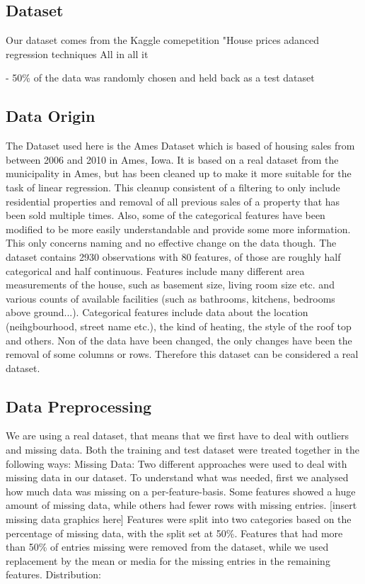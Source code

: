 \documentclass{article}
\begin{document}
\subsection{Dataset} 
Our dataset comes from the Kaggle comepetition "House prices adanced regression techniques \cite{kaggle}
All in all it 

- 50\% of the data was randomly chosen and held back as a test dataset
\subsection{Data Origin}
The Dataset used here is the Ames Dataset \cite{cock_2011} which is based of housing sales from between 2006 and 2010 in Ames, Iowa.
It is based on a real dataset from the municipality in Ames, but has been cleaned up to make it more suitable for the task of linear regression.
This cleanup consistent of a filtering to only include residential properties and removal of all previous sales of a property that has been sold multiple times.
Also, some of the categorical features have been modified to be more easily understandable and provide some more information. This only concerns naming and no effective change on the data though.
The dataset contains 2930 observations with 80 features, of those are roughly half categorical and half continuous. Features include many different area measurements of the house, such as basement size, living room size etc. and various counts of available facilities (such as bathrooms, kitchens, bedrooms above ground...). Categorical features include data about the location (neihgbourhood, street name etc.), the kind of heating, the style of the roof top and others.
Non of the data have been changed, the only changes have been the removal of some columns or rows. Therefore this dataset can be considered a real dataset.
\subsection{Data Preprocessing}
We are using a real dataset, that means that we first have to deal with outliers and missing data. Both the training and test dataset were treated together in the following ways:
Missing Data:\newline
Two different approaches were used to deal with missing data in our dataset. To understand what was needed, first we analysed how much data was missing on a per-feature-basis. Some features showed a huge amount of missing data, while others had fewer rows with missing entries.
[insert missing data graphics here]
Features were split into two categories based on the percentage of missing data, with the split set at 50\%. Features that had more than 50\% of entries missing were removed from the dataset, while we used replacement by the mean or media for the missing entries in the remaining features.\newline
Distribution:\newline
\end{document}
